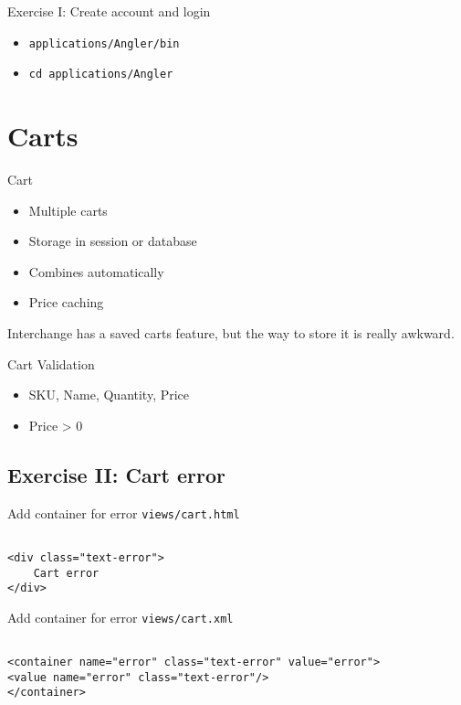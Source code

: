 \begin{frame}[fragile]{Exercise I: Create account and login}
\begin{itemize}
\item \verb|applications/Angler/bin|
\item \verb|cd applications/Angler|
\end{itemize}
\end{frame}

\section{Carts}
\begin{frame}{Cart}
\begin{itemize}
\item Multiple carts
\item Storage in session or database
\item Combines automatically
\item Price caching
\end{itemize}
\end{frame}

Interchange has a saved carts feature, but the way to store it is
really awkward.

\begin{frame}{Cart Validation}
\begin{itemize}
\item SKU, Name, Quantity, Price
\item Price > 0
\end{itemize}
\end{frame}

\subsection{Exercise II: Cart error}
\begin{frame}[fragile]{Add container for error}
\verb|views/cart.html|

\begin{lstlisting}

<div class="text-error">
    Cart error
</div>
\end{lstlisting}
\end{frame}

\begin{frame}[fragile]{Add container for error}
\verb|views/cart.xml|

\begin{lstlisting}

<container name="error" class="text-error" value="error">
<value name="error" class="text-error"/>
</container>
\end{lstlisting}
\end{frame}

